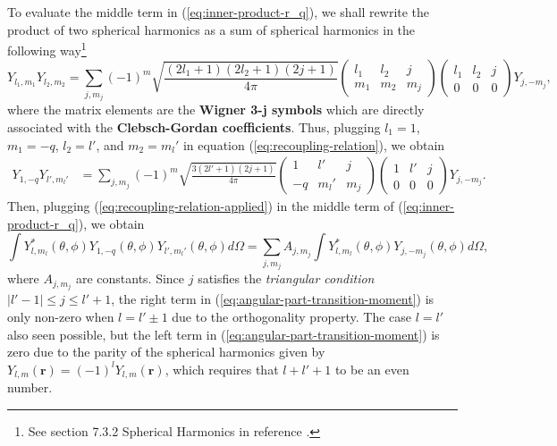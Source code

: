 To evaluate the middle term in (\ref{eq:inner-product-r_q}), we shall rewrite the product of two spherical harmonics as a sum of spherical harmonics in the following way\footnote{See section 7.3.2 Spherical Harmonics in reference \cite{steck2007quantum}.}
\begin{equation}
	Y_{l_1,m_1} Y_{l_2,m_2} = \sum_{j,m_j} (-1)^m \sqrt{\frac{(2l_1 + 1)(2l_2 + 1)(2j + 1)}{4\pi}} \left(\begin{matrix} l_1 & l_2 & j \\ m_1 & m_2 & m_j \end{matrix}\right) \left(\begin{matrix} l_1 & l_2 & j \\ 0 & 0 & 0 \end{matrix}\right)Y_{j,-m_j},
	\label{eq:recoupling-relation}
\end{equation}
where the matrix elements are the \textbf{Wigner 3-j symbols} which are directly associated with the \textbf{Clebsch-Gordan coefficients}. Thus, plugging $ l_1 = 1 $, $ m_1 = -q $, $ l_2 = l' $, and $ m_2 = m_l' $ in equation (\ref{eq:recoupling-relation}), we obtain
\begin{align}
	Y_{1,-q} Y_{l',m_l'} &= \sum_{j,m_j} (-1)^m \sqrt{\frac{3(2l' + 1)(2j + 1)}{4\pi}} \left(\begin{matrix} 1 & l' & j \\ -q & m_l' & m_j \end{matrix}\right) \left(\begin{matrix} 1 & l' & j \\ 0 & 0 & 0 \end{matrix}\right)Y_{j,-m_j}.
	\label{eq:recoupling-relation-applied}
\end{align}
Then, plugging (\ref{eq:recoupling-relation-applied}) in the middle term of (\ref{eq:inner-product-r_q}), we obtain
\begin{equation}
	\int Y_{l,m_l}^*(\theta, \phi) Y_{1, -q}(\theta, \phi) Y_{l', m_l'}(\theta, \phi)d\Omega =  \sum_{j,m_j} A_{j,m_j} \int Y^*_{l,m_l}(\theta, \phi) Y_{j,-m_j}(\theta, \phi) d\Omega,
	\label{eq:angular-part-transition-moment}
\end{equation}
where $ A_{j,m_j} $ are constants. Since $ j $ satisfies the \textit{triangular condition} $ |l' - 1| \leq j \leq l' + 1 $, the right term in (\ref{eq:angular-part-transition-moment}) is only non-zero when $ l = l' \pm 1 $ due to the orthogonality property. The case $ l = l' $ also seen possible, but the left term in (\ref{eq:angular-part-transition-moment}) is zero due to the parity of the spherical harmonics given by $ Y_{l,m}(\mathbf{r}) = (-1)^l Y_{l,m}(\mathbf{r}) $, which requires that $ l + l' + 1 $ to be an even number.

